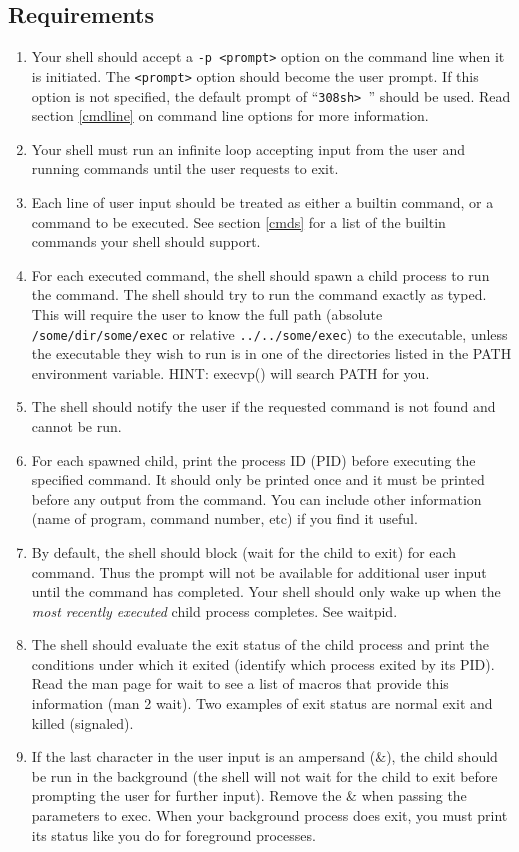 \documentclass[letterpaper,10pt]{article}
\newcommand{\cmd}[1]{\texttt{#1}}
\begin{document}
\subsection{Requirements}
\begin{enumerate}
 \item Your shell should accept a \verb!-p <prompt>! option on the command line when it is initiated. The \verb-<prompt>- option
       should become the user prompt. If this option is not specified, the default prompt of ``\verb'308sh> ''' should be used.
       Read section \ref{cmdline} on command line options for more information.
 \item Your shell must run an infinite loop accepting input from the user and running commands until the user
       requests to exit.
 \item Each line of user input should be treated as either a builtin command, or a command to be executed. See section
  \ref{cmds} for a list of the builtin commands your shell should support.
 \item For each executed command, the shell should spawn a child process to
       run the command. The shell should try to run the command exactly as typed. This will require the user to know
       the full path (absolute \cmd{/some/dir/some/exec} or relative \cmd{../../some/exec}) to the executable, unless the
       executable they wish to run is in one of the directories listed in the PATH environment variable.
       HINT: execvp() will search PATH for you.
 \item The shell should notify the user if the requested command is not found and cannot be run.
 \item For each spawned child, print the process ID (PID) before executing the specified command.
       It should only be printed once and it must be printed before any output from the command.
       You can include other information (name of program, command number, etc) if you find it useful.
 \item By default, the shell should block (wait for the child to exit) for each command. Thus the prompt will not be
       available for additional user input until the command has completed. Your shell should only wake up when the
       \emph{most recently executed} child process completes. See waitpid.
 \item The shell should evaluate the exit status of the child process and print the conditions under which it exited
       (identify which process exited by its PID). Read the man page for wait to see a list of macros that provide this
       information (man 2 wait). Two examples of exit status are normal exit and killed (signaled).
 \item If the last character in the user input is an ampersand (\&), the child should be run in the background (the
       shell will not wait for the child to exit before prompting the user for further input). Remove the \& when
       passing the parameters to exec. When your background process does exit, you must print its status like you do
       for foreground processes. 
       

\end{enumerate}
\end{document}
